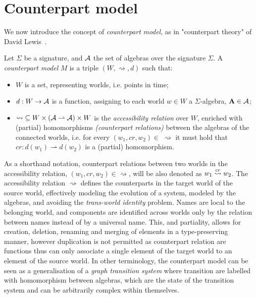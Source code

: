 \section{Counterpart model}

We now introduce the concept of \emph{counterpart model}, as in "counterpart theory" of David
Lewis~\cite{lewis_counterpart_1968,lewis_plurality_2001}.

\begin{definition}
Let $\Sigma$ be a signature, and $\mathcal{A}$ the set of algebras over the signature $\Sigma$. A \emph{counterpart
model} $M$ is a triple $(W, \rightsquigarrow, d)$ such that:
\begin{itemize}
  \item $W$ is a set, representing worlds, i.e. points in time;
  \item $d : W \to \mathcal{A}$ is a function, assigning to each world $w \in W$ a $\Sigma$-algebra, $\mathbf{A} \in
    \mathcal{A}$;
  \item $\rightsquigarrow\;\subseteq W \times (\mathcal{A} \rightharpoonup \mathcal{A}) \times W$ is the
    \emph{accessibility relation} over $W$, enriched with (partial) homomorphisms \emph{(counterpart relations)} between
  the algebras of the connected worlds, i.e. for every $(w_1, cr, w_2) \in\;\rightsquigarrow$ it must hold that $cr :
  d(w_1) \rightharpoonup d(w_2)$ is a (partial) homomorphism.
\end{itemize}
\end{definition}

As a shorthand notation, counterpart relations between two worlds in the accessibility relation, $(w_1, cr, w_2) \in
\rightsquigarrow$, will be also denoted as $w_1 \overset{cr}{\rightsquigarrow} w_2$.
The accessibility relation $\rightsquigarrow$ defines the counterparts in the target world of the source world,
effectively modeling the evolution of a system, modeled by the algebras, and avoiding the \emph{trans-world identity}
problem. Names are local to the belonging world, and components are identified across worlds only by the relation
between names instead of by a universal name. This, and partiality, allows for creation, deletion, renaming and merging
of elements in a type-preserving manner, however duplication is not permitted as counterpart relation are functions thus
can only associate a single element of the target world to an element of the source world.
In other terminology, the counterpart model can be seen as a generalisation of a \emph{graph transition system} where
transition are labelled with homomorphism between algebras, which are the state of the transition system and can be
arbitrarily complex within themselves.

